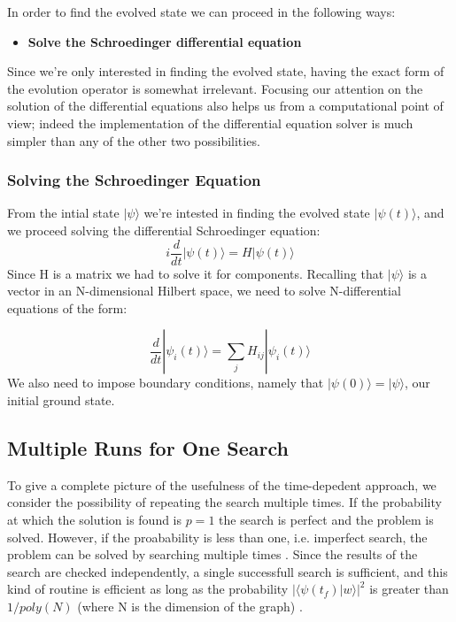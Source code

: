         \noindent
        In order to find the evolved state we can proceed in the following ways:
        \begin{itemize}
          \item \textbf{Solve the Schroedinger differential equation}
        \end{itemize}
        Since we're only interested in finding the evolved state, having the exact form of the evolution operator is somewhat irrelevant. Focusing our attention on the solution of the differential equations also helps us from a computational point of view; indeed the implementation of the differential equation solver is much simpler than any of the other two possibilities.

            \subsubsection*{Solving the Schroedinger Equation}
            From the intial state $|\psi\rangle$ we're intested in finding the evolved state $|\psi(t)\rangle$, and we proceed solving the differential Schroedinger equation:
              \begin{equation}
                i\frac{d}{dt}|\psi(t)\rangle = H |\psi(t)\rangle
              \end{equation}
            Since H is a matrix we had to solve it for components. Recalling that $|\psi\rangle$ is a vector in an N-dimensional Hilbert space, we need to solve N-differential equations of the form:

              \begin{equation}
              \frac{d}{dt}|\psi_i(t)\rangle = \sum_jH_{ij}|\psi_i(t)\rangle
              \end{equation}
            We also need to impose boundary conditions, namely that $|\psi(0)\rangle = |\psi\rangle$, our initial ground state.

        \subsection{Multiple Runs for One Search}
        To give a complete picture of the usefulness of the time-depedent approach, we consider the possibility of repeating the search multiple times. If the probability at which the solution is found is $p=1$ the search is perfect and the problem is solved. However, if the proabability is less than one, i.e. imperfect search, the problem can be solved by searching multiple times . Since the results of the search are checked independently, a single successfull search is sufficient, and this kind of routine is efficient as long as the probability $\big|\langle\psi(t_f)| w\rangle\big|^2$ is greater than $1/poly(N)$ (where N is the dimension of the graph) \cite{Morley2018}.

